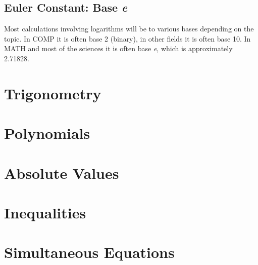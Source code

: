 \subsection{Euler Constant: Base \emph{e}}
\label{sec:EulerConstantBaseE}
Most calculations involving logarithms will be to various bases depending on
the topic. In COMP it is often base 2 (binary), in other fields it is often base
10. In MATH and most of the sciences it is often base \emph{e}, which is
approximately 2.71828. \cite{duWGx}
\section{Trigonometry}
\label{sec:Trigonometry}
\lipsum[1]
\section{Polynomials}
\label{sec:Polynomials}
\lipsum[1]
\section{Absolute Values}
\label{sec:AbsoluteValues}
\lipsum[1]
\section{Inequalities}
\label{sec:Inequalities}
\lipsum[1]
\section{Simultaneous Equations}
\label{sec:SimultaneousEquations}
\lipsum[1]
